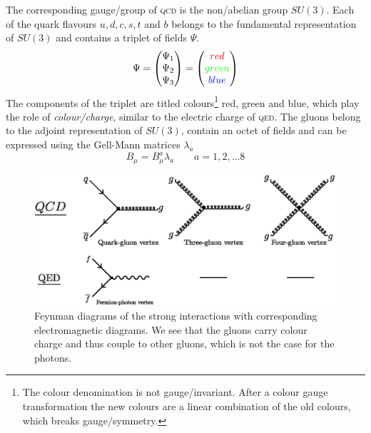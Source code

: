 \documentclass[../../index.tex]{subfiles}
\begin{document}
The corresponding gauge\-/group of \textsc{qcd} is the non\-/abelian group
$SU(3)$. Each of the quark flavours $u,d,c,s,t$ and $b$ belongs to the
fundamental representation of $SU(3)$ and contains a triplet of fields $\Psi$.
\begin{equation}
  \Psi = \begin{pmatrix} \Psi_1 \\ \Psi_2 \\ \Psi_3 \end{pmatrix}
  = \begin{pmatrix} \textcolor{red}{red} \\ \textcolor{green}{green} \\ \textcolor{blue}{blue} \end{pmatrix}
\end{equation}
The components of the triplet are titled colours\footnote{The colour
  denomination is not gauge\-/invariant. After a colour gauge transformation the
  new colours are a linear combination of the old colours, which breaks
  gauge\-/symmetry.} red, green and blue, which play the role of
\textit{colour\-/charge}, similar to the electric charge of \textsc{qed}. The
gluons belong to the adjoint representation of $SU(3)$, contain an octet of
fields and can be expressed using the Gell-Mann matrices $\lambda_a$
\begin{equation}
  B_\mu = B_\mu^a \lambda_a \qquad a = 1,2,\dotsc 8
\end{equation}
\begin{figure}
  \centering \includegraphics[width=\textwidth]{./images/qcdFeynmanDiagrams.eps}
  \caption{Feynman diagrams of the strong interactions with corresponding
    electromagnetic diagrams. We see that the gluons carry colour charge and
    thus couple to other gluons, which is not the case for the photons.}
  \label{fig:qcdFeynmanDiagrams}
\end{figure}
\end{document}
